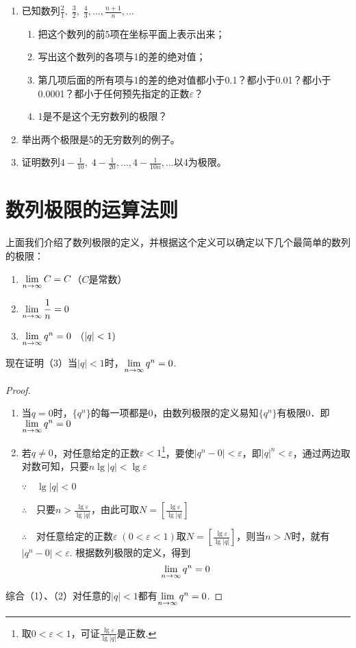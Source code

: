 \begin{ex}
\begin{enumerate}
    \item 已知数列$\frac{2}{1},\; \frac{3}{2},\; \frac{4}{3}, \ldots,\frac{n+1}{n},\ldots$
\begin{enumerate}[(1)]
\item 把这个数列的前5项在坐标平面上表示出来；
\item 写出这个数列的各项与1的差的绝对值；
\item 第几项后面的所有项与1的差的绝对值都小于0.1？都小于0.01？都小于0.0001？都小于任何预先指定的正数$\varepsilon$？
\item 1是不是这个无穷数列的极限？
\end{enumerate}
    \item 举出两个极限是5的无穷数列的例子。
    \item 证明数列$4-\frac{1}{10},\; 4-\frac{1}{20},\ldots, 4-\frac{1}{10n},\ldots$以4为极限。
\end{enumerate}
\end{ex}


\section{数列极限的运算法则}
上面我们介绍了数列极限的定义，并根据这个定义可以确定以下几个最简单的数列的极限：
\begin{enumerate}[(1)]
    \item $\lim\limits_{n\to \infty}C=C$（$C$是常数）
    \item $\lim\limits_{n\to \infty} \dfrac{1}{n}=0 $
    \item $\lim\limits_{n\to \infty} q^n=0\quad (|q|<1) $
\end{enumerate}

现在证明（3）当$|q|<1$时，$\lim\limits_{n\to \infty} q^n=0$.

\begin{proof}
\begin{enumerate}[(1)]
    \item 当$q=0$时，$\{q^n\}$的每一项都是0，由数列极限的定义易知$\{q^n\}$有极限0．即$\lim\limits_{n\to \infty} q^n=0$
    \item 若$q\ne 0$，对任意给定的正数$\varepsilon<1$\footnote{取$0<\varepsilon<1$，可证$\frac{\lg \varepsilon}{\lg|q|}$是正数.}，要使$|q^n-0|<\varepsilon$，即$|q|^n<\varepsilon$，通过两边取对数可知，只要$n\lg |q|<\lg \varepsilon$

$\because\quad \lg|q|<0$

$\therefore\quad $只要$n>\frac{\lg\varepsilon}{\lg|q|}$，由此可取$N=\left[\frac{\lg\varepsilon}{\lg|q|}\right]$

$\therefore\quad $对任意给定的正数$\varepsilon\; (0<\varepsilon<1)$取$N=\left[\frac{\lg\varepsilon}{\lg|q|}\right]$，则当$n>N$时，就有$|q^n-0|<\varepsilon$. 根据数列极限的定义，得到
\[\lim\limits_{n\to \infty} q^n=0\]
\end{enumerate}

综合（1）、（2）对任意的$|q|<1$都有$\lim\limits_{n\to \infty} q^n=0$.
\end{proof}

